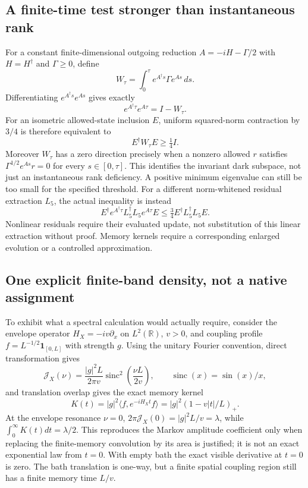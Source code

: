 \documentclass[11pt,a4paper]{article}
\begin{document}
\subsection{A finite-time test stronger than instantaneous rank}

For a constant finite-dimensional outgoing reduction
$A=-iH-\Gamma/2$ with $H=H^\dagger$ and $\Gamma\geq0$, define
\[
 W_\tau=\int_0^\tau e^{A^\dagger s}\Gamma e^{As}\,ds.
\]
Differentiating $e^{A^\dagger s}e^{As}$ gives exactly
\[
 e^{A^\dagger\tau}e^{A\tau}=I-W_\tau.
\]
For an isometric allowed-state inclusion $E$, uniform squared-norm
contraction by $3/4$ is therefore equivalent to
\[
 E^\dagger W_\tau E\geq\tfrac14 I.
\]
Moreover $W_\tau$ has a zero direction precisely when a nonzero
allowed $r$ satisfies $\Gamma^{1/2}e^{As}r=0$ for every
$s\in[0,\tau]$. This identifies the invariant dark subspace,
not just an instantaneous rank deficiency. A positive minimum
eigenvalue can still be too small for the specified threshold.
For a different norm-whitened residual extraction $L_5$, the actual
inequality is instead
\[
 E^\dagger e^{A^\dagger\tau}L_5^\dagger L_5 e^{A\tau}E
 \leq\tfrac34 E^\dagger L_5^\dagger L_5 E.
\]
Nonlinear residuals require their evaluated update, not substitution
of this linear extraction without proof. Memory kernels require a
corresponding enlarged evolution or a controlled approximation.

\subsection{One explicit finite-band density, not a native assignment}

To exhibit what a spectral calculation would actually require,
consider the envelope operator $H_X=-iv\partial_x$ on
$L^2(\mathbb R)$, $v>0$, and coupling profile
$f=L^{-1/2}\mathbf1_{[0,L]}$ with strength $g$.
Using the unitary Fourier convention, direct transformation gives
\[
 \mathcal J_X(\nu)=\frac{|g|^2L}{2\pi v}
   \operatorname{sinc}^2\!\left(\frac{\nu L}{2v}\right),
 \qquad \operatorname{sinc}(x)=\sin(x)/x,
\]
and translation overlap gives the exact memory kernel
\[
 K(t)=|g|^2\langle f,e^{-iH_Xt}f\rangle
     =|g|^2(1-v|t|/L)_+.
\]
At the envelope resonance $\nu=0$, $2\pi\mathcal J_X(0)
=|g|^2L/v=\lambda$, while
$\int_0^\infty K(t)dt=\lambda/2$. This reproduces the Markov
amplitude coefficient only when replacing the finite-memory
convolution by its area is justified; it is not an exact exponential
law from $t=0$. With empty bath the exact visible derivative at
$t=0$ is zero. The bath translation is one-way, but a finite spatial
coupling region still has a finite memory time $L/v$.
\end{document}
